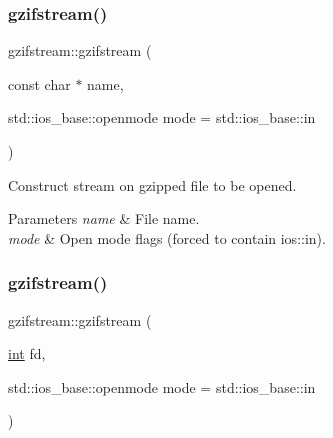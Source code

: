 \mbox{\label{classgzifstream_a90f6e0eea83b7ce3c64f755b51b5b011}} 
\subsubsection{\texorpdfstring{gzifstream()}{gzifstream()}\hspace{0.1cm}{\footnotesize\ttfamily [2/3]}}
{\footnotesize\ttfamily gzifstream\+::gzifstream (\begin{DoxyParamCaption}\item[{const char $\ast$}]{name,  }\item[{std\+::ios\+\_\+base\+::openmode}]{mode = {\ttfamily std\+:\+:ios\+\_\+base\+:\+:in} }\end{DoxyParamCaption})\hspace{0.3cm}{\ttfamily [explicit]}}



Construct stream on gzipped file to be opened. 


\begin{DoxyParams}{Parameters}
{\em name} & File name. \\
\hline
{\em mode} & Open mode flags (forced to contain ios\+::in). \\
\hline
\end{DoxyParams}
\mbox{\label{classgzifstream_aa5ab9dcc3ab35bffe781f4c49239826e}} 
\subsubsection{\texorpdfstring{gzifstream()}{gzifstream()}\hspace{0.1cm}{\footnotesize\ttfamily [3/3]}}
{\footnotesize\ttfamily gzifstream\+::gzifstream (\begin{DoxyParamCaption}\item[{\hyperlink{lp__lib_8h_adeb9ec6400320e4923ac9d836d509ddb}{int}}]{fd,  }\item[{std\+::ios\+\_\+base\+::openmode}]{mode = {\ttfamily std\+:\+:ios\+\_\+base\+:\+:in} }\end{DoxyParamCaption})\hspace{0.3cm}{\ttfamily [explicit]}}



